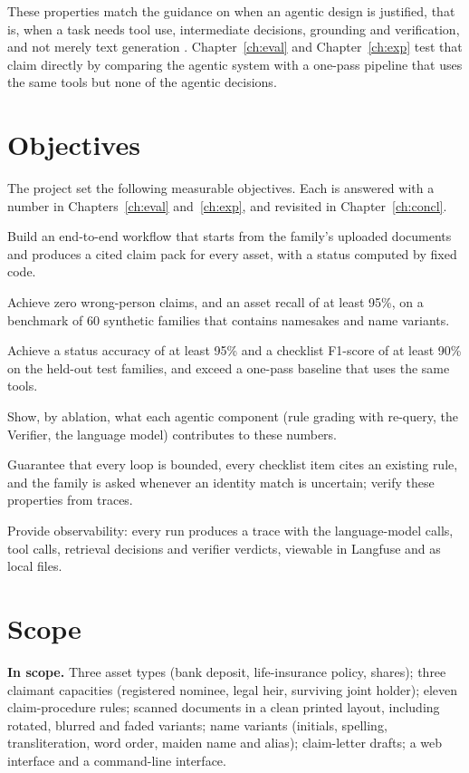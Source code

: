 These properties match the guidance on when an agentic design is justified, that is, when a task needs tool use, intermediate decisions, grounding and verification, and not merely text generation \cite{anthropic2024agents,yao2023react}. Chapter~\ref{ch:eval} and Chapter~\ref{ch:exp} test that claim directly by comparing the agentic system with a one-pass pipeline that uses the same tools but none of the agentic decisions.

\section{Objectives}
The project set the following measurable objectives. Each is answered with a number in Chapters~\ref{ch:eval} and~\ref{ch:exp}, and revisited in Chapter~\ref{ch:concl}.

\begin{description}[leftmargin=1.4cm,labelwidth=1.1cm,itemsep=2pt]
\item[O1] Build an end-to-end workflow that starts from the family's uploaded documents and produces a cited claim pack for every asset, with a status computed by fixed code.
\item[O2] Achieve zero wrong-person claims, and an asset recall of at least 95\%, on a benchmark of 60 synthetic families that contains namesakes and name variants.
\item[O3] Achieve a status accuracy of at least 95\% and a checklist F1-score of at least 90\% on the held-out test families, and exceed a one-pass baseline that uses the same tools.
\item[O4] Show, by ablation, what each agentic component (rule grading with re-query, the Verifier, the language model) contributes to these numbers.
\item[O5] Guarantee that every loop is bounded, every checklist item cites an existing rule, and the family is asked whenever an identity match is uncertain; verify these properties from traces.
\item[O6] Provide observability: every run produces a trace with the language-model calls, tool calls, retrieval decisions and verifier verdicts, viewable in Langfuse and as local files.
\end{description}

\section{Scope}
\textbf{In scope.} Three asset types (bank deposit, life-insurance policy, shares); three claimant capacities (registered nominee, legal heir, surviving joint holder); eleven claim-procedure rules; scanned documents in a clean printed layout, including rotated, blurred and faded variants; name variants (initials, spelling, transliteration, word order, maiden name and alias); claim-letter drafts; a web interface and a command-line interface.

